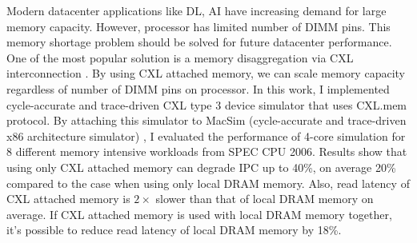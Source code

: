 \begin{EnglishAbstract}

  Modern datacenter applications like DL, AI have increasing demand for large memory capacity. However, processor has limited number of DIMM pins. This memory shortage problem should be solved for future datacenter performance. One of the most popular solution is a memory disaggregation via CXL interconnection \cite{CXL}. By using CXL attached memory, we can scale memory capacity regardless of number of DIMM pins on processor. In this work, I implemented cycle-accurate and trace-driven CXL type 3 device simulator that uses CXL.mem protocol. By attaching this simulator to MacSim (cycle-accurate and trace-driven x86 architecture simulator) \cite{MACSIM}, I evaluated the performance of 4-core simulation for 8 different memory intensive workloads from SPEC CPU 2006. Results show that using only CXL attached memory can degrade IPC up to 40\%, on average 20\% compared to the case when using only local DRAM memory. Also, read latency of CXL attached memory is $2\times$ slower than that of local DRAM memory on average. If CXL attached memory is used with local DRAM memory together, it's possible to reduce read latency of local DRAM memory by 18\%.
  
\end{EnglishAbstract}
